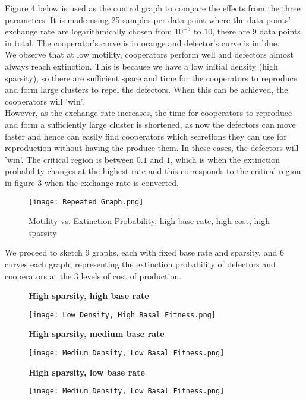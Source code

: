 \documentclass[11pt]{article}
\begin{document}
\noindent Figure 4 below is used as the control graph to compare the effects from the three parameters. It is made using 25 samples per data point where the data points' exchange rate are logarithmically chosen from $10^{-3}$ to $10$, there are 9 data points in total. The cooperator's curve is in orange and defector's curve is in blue.\\
We observe that at low motility, cooperators perform well and defectors almost always reach extinction. This is because we have a low initial density (high sparsity), so there are sufficient space and time for the cooperators to reproduce and form large clusters to repel the defectors. When this can be achieved, the cooperators will 'win'. \\
However, as the exchange rate increases, the time for cooperators to reproduce and form a sufficiently large cluster is shortened, as now the defectors can move faster and hence can easily find cooperators which secretions they can use for reproduction without having the produce them. In these cases, the defectors will 'win'. The critical region is between $0.1$ and $1$, which is when the extinction probability changes at the highest rate and this corresponds to the critical region in figure 3 when the exchange rate is converted.
\begin{figure}[H]
    \centering
    \texttt{[image: Repeated Graph.png]}
    \caption{Motility vs. Extinction Probability, high base rate, high cost, high sparsity}
\end{figure}
\noindent We proceed to sketch 9 graphs, each with fixed base rate and sparsity, and 6 curves each graph, representing the extinction probability of defectors and cooperators at the 3 levels of cost of production.\\
\begin{figure}[H]
            \centering
            \textbf{High sparsity, high base rate}\par
            \texttt{[image: Low Density, High Basal Fitness.png]}
            \caption{}
\end{figure}
\begin{figure}[H]
            \centering
            \textbf{High sparsity, medium base rate}\par
            \texttt{[image: Medium Density, Low Basal Fitness.png]}
            \caption{}
\end{figure}
\begin{figure}[H]
            \centering
            \textbf{High sparsity, low base rate}\par
            \texttt{[image: Medium Density, Low Basal Fitness.png]}
            \caption{}        
\end{figure}
\end{document}
